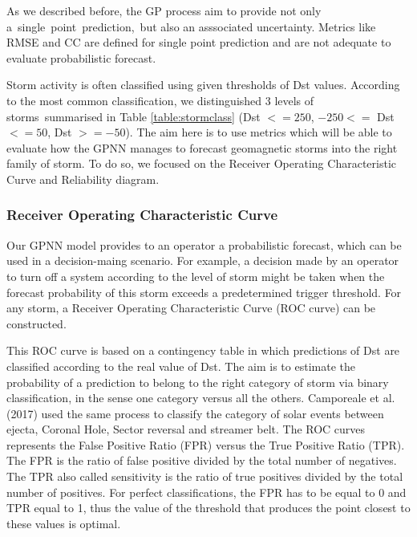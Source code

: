 As we described before, the GP process aim to provide not only a\ single\ point\ prediction,\ 
but also an asssociated  uncertainty. Metrics like RMSE and CC are defined for single point prediction 
and  are not adequate  to evaluate  probabilistic forecast.


Storm activity is often classified using given thresholds of Dst values. According to the most common 
classification, we distinguished 3 levels of storms summarised in Table \ref{table:stormclass} 
(Dst $<= 250$, $-250 <=$ Dst $<= 50$, Dst $>= -50$). The aim here is to use metrics which will be able to evaluate 
how the GPNN manages to forecast geomagnetic storms into the right family of storm. To do so, 
we focused on the Receiver Operating Characteristic Curve and Reliability diagram.



\subsubsection{Receiver Operating Characteristic Curve}


Our GPNN model provides to an operator a probabilistic forecast, which can be used in a decision-maing scenario. 
For example, a decision made by an operator to turn off a system according to the level of storm might be taken 
when the forecast probability of this storm exceeds a predetermined trigger threshold. For any storm, 
a Receiver Operating Characteristic Curve (ROC curve) can be constructed. 

This ROC curve is based on a contingency table in which predictions of Dst are classified according to the 
real value of Dst. The aim is to estimate the probability of a prediction to belong to the right category of storm 
via binary classification, in the sense one category versus all the others. Camporeale et al. (2017) used the 
same process to classify the category of solar events between ejecta, Coronal Hole, Sector reversal and streamer belt. 
The ROC curves represents the False Positive Ratio (FPR) versus the True Positive Ratio (TPR). The FPR is the ratio 
of false positive divided by the total number of negatives. The TPR also called sensitivity is the ratio of 
true positives divided by the total number of positives. For perfect classifications, the FPR has to be equal to 0 
and TPR equal to 1, thus the value of the threshold that produces the point closest to these values is optimal. 



